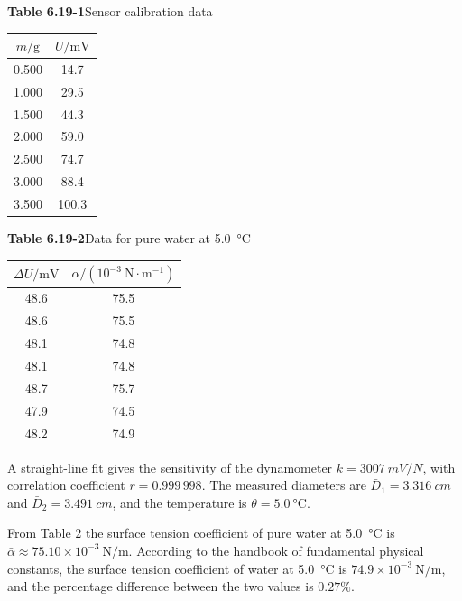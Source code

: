 \begin{center}
\begin{minipage}[t]{0.40\linewidth}\centering
\textbf{Table 6.19-1}\quad Sensor calibration data\\[3pt]
\begin{tabular}{cc}
\toprule
$m/\mathrm{g}$ & $U/\mathrm{mV}$\\
\midrule
0.500 & 14.7\\
1.000 & 29.5\\
1.500 & 44.3\\
2.000 & 59.0\\
2.500 & 74.7\\
3.000 & 88.4\\
3.500 & 100.3\\
\bottomrule
\end{tabular}
\end{minipage}\hfill
\begin{minipage}[t]{0.55\linewidth}\centering
\textbf{Table 6.19-2}\quad Data for pure water at \SI{5.0}{\celsius}\\[3pt]
\begin{tabular}{cc}
\toprule
$\Delta U/\mathrm{mV}$ & $\alpha/(10^{-3}\ \mathrm{N\cdot m^{-1}})$\\
\midrule
48.6 & 75.5\\
48.6 & 75.5\\
48.1 & 74.8\\
48.1 & 74.8\\
48.7 & 75.7\\
47.9 & 74.5\\
48.2 & 74.9\\
\bottomrule
\end{tabular}
\end{minipage}
\end{center}

\noindent A straight-line fit gives the sensitivity of the dynamometer $k=\SI{3007}{mV/N}$, with correlation coefficient $r=0.999\,998$. The measured diameters are $\bar D_1=\SI{3.316}{cm}$ and $\bar D_2=\SI{3.491}{cm}$, and the temperature is $\theta=\SI{5.0}{\celsius}$.

From Table 2 the surface tension coefficient of pure water at \SI{5.0}{\celsius} is $\bar\alpha\approx75.10\times10^{-3}\ \mathrm{N/m}$. According to the handbook of fundamental physical constants, the surface tension coefficient of water at \SI{5.0}{\celsius} is $74.9\times10^{-3}\ \mathrm{N/m}$, and the percentage difference between the two values is $0.27\%$.


